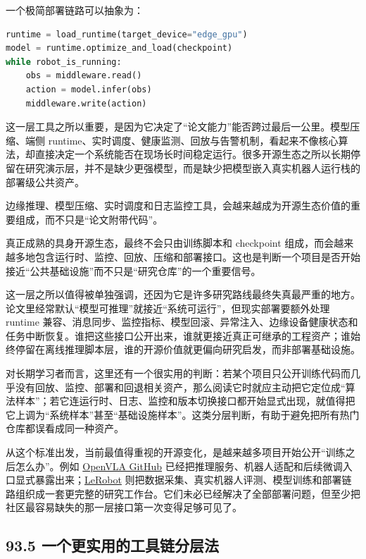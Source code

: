 一个极简部署链路可以抽象为：

\begin{lstlisting}[language=python]
runtime = load_runtime(target_device="edge_gpu")
model = runtime.optimize_and_load(checkpoint)
while robot_is_running:
    obs = middleware.read()
    action = model.infer(obs)
    middleware.write(action)
\end{lstlisting}

这一层工具之所以重要，是因为它决定了“论文能力”能否跨过最后一公里。模型压缩、端侧 runtime、实时调度、健康监测、回放与告警机制，看起来不像核心算法，却直接决定一个系统能否在现场长时间稳定运行。很多开源生态之所以长期停留在研究演示层，并不是缺少更强模型，而是缺少把模型嵌入真实机器人运行栈的部署级公共资产。

边缘推理、模型压缩、实时调度和日志监控工具，会越来越成为开源生态价值的重要组成，而不只是“论文附带代码”。

真正成熟的具身开源生态，最终不会只由训练脚本和 checkpoint 组成，而会越来越多地包含运行时、监控、回放、压缩和部署接口。这也是判断一个项目是否开始接近“公共基础设施”而不只是“研究仓库”的一个重要信号。

这一层之所以值得被单独强调，还因为它是许多研究路线最终失真最严重的地方。论文里经常默认“模型可推理”就接近“系统可运行”，但现实部署要额外处理 runtime 兼容、消息同步、监控指标、模型回滚、异常注入、边缘设备健康状态和任务中断恢复。谁把这些接口公开出来，谁就更接近真正可继承的工程资产；谁始终停留在离线推理脚本层，谁的开源价值就更偏向研究启发，而非部署基础设施。

对长期学习者而言，这里还有一个很实用的判断：若某个项目只公开训练代码而几乎没有回放、监控、部署和回退相关资产，那么阅读它时就应主动把它定位成“算法样本”；若它连运行时、日志、监控和版本切换接口都开始显式出现，就值得把它上调为“系统样本”甚至“基础设施样本”。这类分层判断，有助于避免把所有热门仓库都误看成同一种资产。

从这个标准出发，当前最值得重视的开源变化，是越来越多项目开始公开“训练之后怎么办”。例如 \href{https://github.com/openvla/openvla}{OpenVLA GitHub} 已经把推理服务、机器人适配和后续微调入口显式暴露出来；\href{https://github.com/huggingface/lerobot}{LeRobot} 则把数据采集、真实机器人评测、模型训练和部署链路组织成一套更完整的研究工作台。它们未必已经解决了全部部署问题，但至少把社区最容易缺失的那一层接口第一次变得足够可见了。

\subsection*{93.5 一个更实用的工具链分层法}


